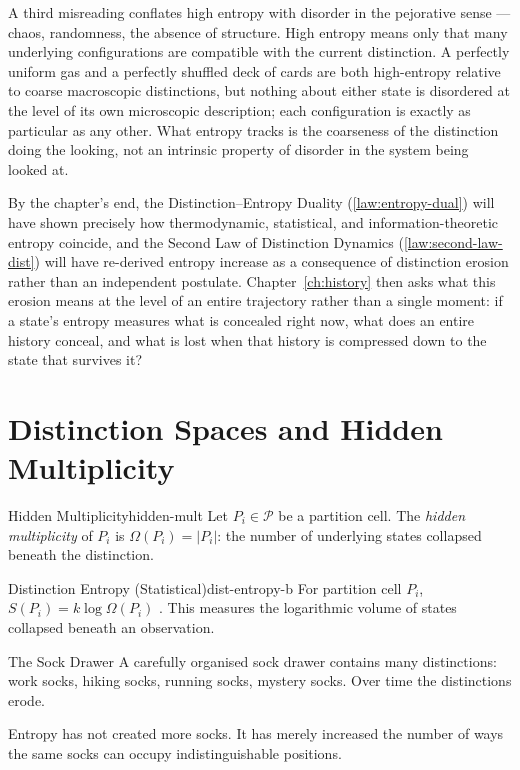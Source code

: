 \documentclass[12pt,twoside,openright]{book}
\newcommand{\partition}{\mathcal{P}}
\begin{document}
A third misreading conflates high entropy with disorder in
the pejorative sense --- chaos, randomness, the absence of
structure. High entropy means only that many underlying
configurations are compatible with the current distinction. A
perfectly uniform gas and a perfectly shuffled deck of cards
are both high-entropy relative to coarse macroscopic
distinctions, but nothing about either state is disordered at
the level of its own microscopic description; each
configuration is exactly as particular as any other. What
entropy tracks is the coarseness of the distinction doing the
looking, not an intrinsic property of disorder in the system
being looked at.

By the chapter's end, the Distinction--Entropy Duality
(\cref{law:entropy-dual}) will have shown precisely how
thermodynamic, statistical, and information-theoretic entropy
coincide, and the Second Law of Distinction Dynamics
(\cref{law:second-law-dist}) will have re-derived entropy
increase as a consequence of distinction erosion rather than
an independent postulate. Chapter~\ref{ch:history} then asks
what this erosion means at the level of an entire trajectory
rather than a single moment: if a state's entropy measures
what is concealed right now, what does an entire history
conceal, and what is lost when that history is compressed
down to the state that survives it?

\section{Distinction Spaces and Hidden Multiplicity}
\label{sec:ch3-hidden}

\begin{definition}{Hidden Multiplicity}{hidden-mult}
  Let $P_i \in \partition$ be a partition cell.
  The \emph{hidden multiplicity} of $P_i$ is
  $\Omega(P_i) = |P_i|$: the number of underlying
  states collapsed beneath the distinction.
\end{definition}

\begin{definition}{Distinction Entropy (Statistical)}{dist-entropy-b}
  For partition cell $P_i$,
  $S(P_i) = k \log \Omega(P_i)$
  \parencite{boltzmann1877}.
  This measures the logarithmic volume of states
  collapsed beneath an observation.
\end{definition}

\begin{distinctionaside}{The Sock Drawer}
A carefully organised sock drawer contains many
distinctions: work socks, hiking socks, running socks,
mystery socks. Over time the distinctions erode.

Entropy has not created more socks. It has merely increased
the number of ways the same socks can occupy
indistinguishable positions.
\end{distinctionaside}
\end{document}
